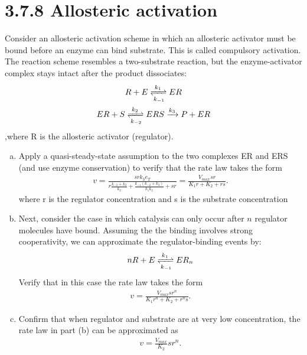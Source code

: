 \documentclass[paper=a4, fontsize=11pt]{scrartcl} %
\numberwithin{equation}{section} %
\numberwithin{figure}{section} %
\numberwithin{table}{section} %
\begin{document}
\section{3.7.8 Allosteric activation}
	Consider an allosteric activation scheme in which an allosteric activator must be bound before an enzyme can bind substrate. This is called compulsory activation. The reaction scheme resembles a two-substrate reaction, but the enzyme-activator complex stays intact after the product dissociates:
	\begin{gather*}
		R + E \xrightleftharpoons[k_{-1}]{k_1} ER\\
		ER + S \xrightleftharpoons[k_{-2}]{k_2} ERS \xrightarrow{k_3} P + ER
	\end{gather*}
	,where R is the allosteric activator (regulator).
	\begin{enumerate}[a)]
		\item  Apply a quasi-steady-state assumption to the two complexes ER and ERS (and use enzyme conservation) to verify that the rate law takes the form
		\begin{gather*}
			v=\frac{srk_3e_T}{r\frac{k_{-2}+k_3}{k_2}+\frac{k_{-1}(k_{-2}+k_3)}{k_1k_2}+sr}=\frac{V_{max}sr}{K_1r+K_2+rs}.
		\end{gather*}
		where r is the regulator concentration and s is the substrate concentration

		\item Next, consider the case in which catalysis can only occur after $n$ regulator molecules have bound. Assuming the the binding involves strong cooperativity, we can approximate the regulator-binding events by:
		\begin{gather*}
			nR + E \xrightleftharpoons[k_{-1}]{k_1} ER_n
		\end{gather*}
		Verify that in this case the rate law takes the form
		\begin{gather*}
			v=\frac{V_{max}sr^n}{K_1r^n+K_2+r^ns}.
		\end{gather*}

		\item  Confirm that when regulator and substrate are at very low concentration, the rate law in part (b) can be approximated as
		\begin{gather*}
			v=\frac{V_{max}}{K_2}sr^n.
		\end{gather*}

	\end{enumerate}
\end{document}
